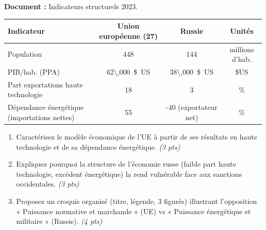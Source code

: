 \documentclass[11pt]{article}
\begin{document}
\begin{exercice}
\label{exo:ue_russie}
\textbf{Document :} Indicateurs structurels 2023.

\begin{center}
\begin{tabular}{lccc}
\toprule
Indicateur & Union européenne (27) & Russie & Unités \\
\midrule
Population & 448 & 144 & millions d'hab. \\
PIB/hab. (PPA) & \SI{62\,000}{\$US} & \SI{38\,000}{\$US} & \$US \\
Part exportations haute technologie & 18 & 3 & \% \\
Dépendance énergétique (importations nettes) & 55 & -40 (exportateur net) & \% \\
\bottomrule
\end{tabular}
\end{center}

\begin{enumerate}
\item Caractérisez le modèle économique de l'UE à partir de ses résultats en haute technologie et de sa dépendance énergétique. \textit{(3 pts)}
\item Expliquez pourquoi la structure de l'économie russe (faible part haute technologie, excédent énergétique) la rend vulnérable face aux sanctions occidentales. \textit{(3 pts)}
\item Proposez un croquis organisé (titre, légende, 3 figurés) illustrant l'opposition « Puissance normative et marchande » (UE) vs « Puissance énergétique et militaire » (Russie). \textit{(4 pts)}
\end{enumerate}
\end{exercice}
\end{document}
